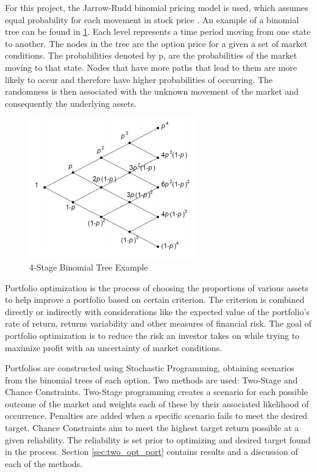 \documentclass[12pt]{article}
\begin{document}
For this project, the Jarrow-Rudd binomial pricing model is used, which assumes equal probability for each movement in stock price \cite{jarrow1983option, jrudd_other, jrudd_impl}. An example of a binomial tree can be found in \ref{fig:bin_tree}. Each level represents a time period moving from one state to another. The nodes in the tree are the option price for a given a set of market conditions. The probabilities denoted by p, are the probabilities of the market moving to that state. Nodes that have more paths that lead to them are more likely to occur and therefore have higher probabilities of occurring. The randomness is then associated with the unknown movement of the market and consequently the underlying assets.
 
 \begin{figure}[H]
  \begin{centering}
    \includegraphics[scale=1.0]{bin_tree.png}
    \caption{4-Stage Binomial Tree Example \cite{bin_tree}}
    \label{fig:bin_tree}
  \end{centering}
\end{figure}
 
Portfolio optimization is the process of choosing the proportions of various assets to help improve a portfolio based on certain criterion. The criterion is combined directly or indirectly with considerations like the expected value of the portfolio’s rate of return, returns variability and other measures of financial risk. The goal of portfolio optimization is to reduce the risk an investor takes on while trying to maximize profit with an uncertainty of market conditions.

Portfolios are constructed using Stochastic Programming, obtaining scenarios from the binomial trees of each option. Two methods are used: Two-Stage and Chance Constraints. Two-Stage programming creates a scenario for each possible outcome of the market and weights each of these by their associated likelihood of occurrence. Penalties are added when a specific scenario fails to meet the desired target. Chance Constraints aim to meet the highest target return possible at a given reliability. The reliability is set prior to optimizing and desired target found in the process. Section \ref{sec:two_opt_port} contains results and a discussion of each of the methods.
\end{document}
